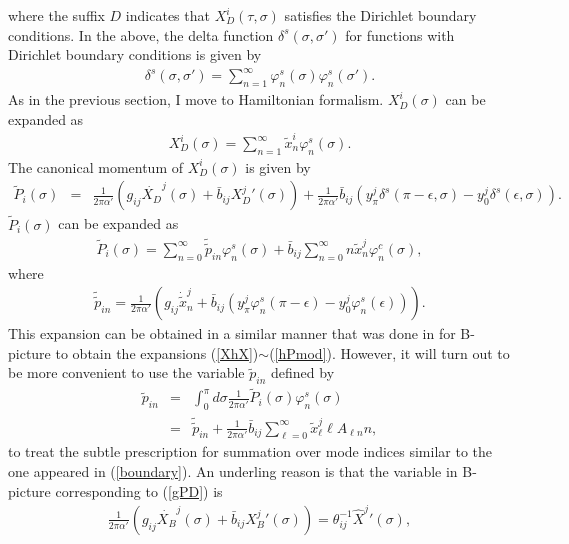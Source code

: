 \documentclass[a4paper,12pt]{article}
\newcommand{\nn}{\nonumber\\}
\newcommand{\co}{\varphi^c}
\newcommand{\si}{\varphi^s}
\newcommand{\e}{\epsilon}
\newcommand{\XB}{X_B}
\newcommand{\XD}{X_D}
\begin{document}
where the suffix $D$
indicates that
$\XD^i(\tau,\sigma)$ satisfies the
Dirichlet boundary conditions. 
In the above, 
the delta function $\delta^s(\sigma,\sigma')$ for 
functions with Dirichlet
boundary conditions 
is given by
\begin{eqnarray}
 \label{deltas}
\delta^s(\sigma,\sigma')
= 
\sum_{n=1}^\infty
\si_n(\sigma) \si_n (\sigma').
\end{eqnarray}
As in the previous section,
I move to Hamiltonian formalism.
$\XD^i(\sigma)$
can be expanded as
\begin{eqnarray}
 \label{gXmod}
\XD^i(\sigma)
=
\sum_{n=1}^\infty
\tilde{x}^i_n \si_n (\sigma).
\end{eqnarray}
The canonical momentum of $\XD^i(\sigma)$
is given by
\begin{eqnarray}
 \label{gPD}
\tilde{P}_i(\sigma)
&=&
\frac{1}{2\pi\alpha'}
\left(
g_{ij} \dot{\XD}^j(\sigma) 
+
\bar{b}_{ij} {\XD^j}'(\sigma) 
\right)
+
\frac{1}{2\pi\alpha'}
\bar{b}_{ij}
 \left( 
y^j_\pi 
   \delta^s(\pi-\e,\sigma)
 - y^j_0 
\delta^s(\e,\sigma)
 \right).
\end{eqnarray}
$\tilde{P}_i(\sigma)$ can be expanded as
\begin{eqnarray}
 \label{PD}
\tilde{P}_i(\sigma)
=
\sum_{n=0}^\infty
\tilde{\tilde{p}}_{in} \si_n(\sigma) 
+
\bar{b}_{ij} \sum_{n=0}^\infty
n \tilde{x}_n^j
\co_n(\sigma),
\end{eqnarray}
where
\begin{eqnarray}
 \label{dtildp}
\tilde{\tilde{p}}_{in}
=
\frac{1}{2\pi\alpha'}
\left(
g_{ij} \dot{\tilde{x}}_n^j
+
\bar{b}_{ij} 
 \left(
y^j_\pi 
   \si_n (\pi-\e)
 -y^j_0 
   \si_n (\e)
 \right)
\right).
\end{eqnarray}
This expansion can be obtained
in a similar manner that was done in \cite{KT1}
for B-picture to obtain the expansions
(\ref{XhX})$\sim$(\ref{hPmod}).
However, it will turn out
to be more convenient to use the
variable $\tilde{p}_{in}$ defined by
\begin{eqnarray}
 \label{tp}
\tilde{p}_{in}
&=&
\int_0^\pi d\sigma
\frac{1}{2\pi\alpha'}
\tilde{P}_i(\sigma)
\si_n(\sigma) 
\nn
&=&
\tilde{\tilde{p}}_{in} +
\frac{1}{2\pi\alpha'}
\bar{b}_{ij} 
\sum_{\ell = 0}^\infty
\tilde{x}_\ell^j \ell A_{\ell n} n,
\end{eqnarray}
to treat the subtle prescription for
summation over mode indices
similar to the one appeared in (\ref{boundary}).
An underling reason is that
the variable in B-picture corresponding to
(\ref{gPD}) is
\begin{eqnarray}
 \label{BhX'}
\frac{1}{2\pi\alpha'}
\left(
g_{ij}\dot{\XB}^j(\sigma)
+
\bar{b}_{ij} {\XB^j}'(\sigma)
\right)
=
\theta^{-1}_{ij}
\hat{X}^j{}'(\sigma),
\end{eqnarray}
\end{document}
